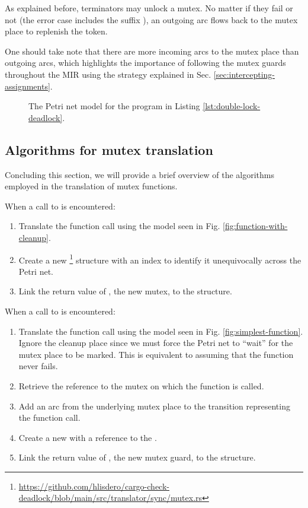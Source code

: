 As explained before,  terminators may unlock a mutex.
No matter if they fail or not (the error case includes the suffix ),
an outgoing arc flows back to the mutex place to replenish the token.

One should take note that there are more incoming arcs to the mutex place than outgoing arcs,
which highlights the importance of following the mutex guards throughout the \acrshort{MIR}
using the strategy explained in Sec. \ref{sec:intercepting-assignments}.

\begin{figure}[!htbp]
  \centering
  
  \caption{The Petri net model for the program in Listing \ref{lst:double-lock-deadlock}.}
  \label{fig:mutex-example}
\end{figure}

\subsection{Algorithms for mutex translation}
\label{sec:mutex-algorithms}

Concluding this section, we will provide a brief overview of the algorithms
employed in the translation of mutex functions.

When a call to  is encountered:

\begin{enumerate}
  \item Translate the function call using the model seen in Fig. \ref{fig:function-with-cleanup}.
  \item Create a new \footnote{\url{https://github.com/hlisdero/cargo-check-deadlock/blob/main/src/translator/sync/mutex.rs}}
        structure with an index to identify it unequivocally across the Petri net.
  \item Link the return value of ,
        the new mutex, to the  structure.
\end{enumerate}

When a call to  is encountered:

\begin{enumerate}
  \item Translate the function call using the model seen in Fig. \ref{fig:simplest-function}.
        Ignore the cleanup place since we must force the Petri net
        to ``wait'' for the mutex place to be marked.
        This is equivalent to assuming that the  function never fails.
  \item Retrieve the  reference to the mutex on which the function is called.
  \item Add an arc from the underlying mutex place to the transition representing the function call.
  \item Create a new  with a reference to the .
  \item Link the return value of ,
        the new mutex guard, to the  structure.
\end{enumerate}

